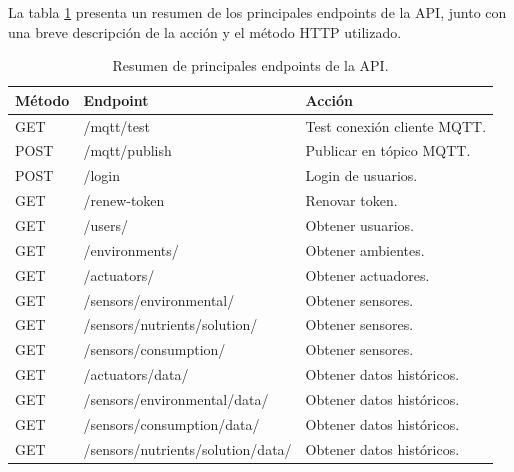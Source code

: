 La tabla \ref{tab:endpoints} presenta un resumen de los principales endpoints
de la API, junto con una breve descripción de la acción y el método HTTP
utilizado.

\begin{table}[H]
    \centering
    \caption[Resumen de principales endpoints de la API]{Resumen de principales endpoints de la API.}
    \begin{tabular}{l l l}
        \toprule
        \textbf{Método} & \textbf{Endpoint}                 & \textbf{Acción}             \\
        \midrule
        GET             & /mqtt/test                        & Test conexión cliente MQTT. \\
        POST            & /mqtt/publish                     & Publicar en tópico MQTT.    \\
        \midrule
        POST            & /login                            & Login de usuarios.          \\
        GET             & /renew-token                      & Renovar token.              \\
        \midrule
        GET             & /users/                           & Obtener usuarios.           \\
        \midrule
        GET             & /environments/                    & Obtener ambientes.          \\
        \midrule
        GET             & /actuators/                       & Obtener actuadores.         \\
        \midrule
        GET             & /sensors/environmental/           & Obtener sensores.           \\
        \midrule
        GET             & /sensors/nutrients/solution/      & Obtener sensores.           \\
        \midrule
        GET             & /sensors/consumption/             & Obtener sensores.           \\
        \midrule
        GET             & /actuators/data/                  & Obtener datos históricos.   \\
        GET             & /sensors/environmental/data/      & Obtener datos históricos.   \\
        GET             & /sensors/consumption/data/        & Obtener datos históricos.   \\
        GET             & /sensors/nutrients/solution/data/ & Obtener datos históricos.   \\
        \bottomrule
        \hline
    \end{tabular}
    \label{tab:endpoints}
\end{table}

